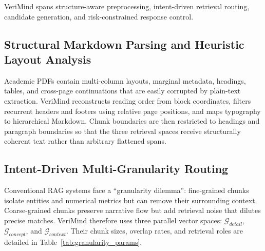 \documentclass[smallextended]{svjour3}
\begin{document}
VeriMind spans structure-aware preprocessing, intent-driven retrieval routing, candidate generation, and risk-constrained response control.

\subsection{Structural Markdown Parsing and Heuristic Layout Analysis}
\label{sec:structural_parsing}

Academic PDFs contain multi-column layouts, marginal metadata, headings, tables, and cross-page continuations that are easily corrupted by plain-text extraction. VeriMind reconstructs reading order from block coordinates, filters recurrent headers and footers using relative page positions, and maps typography to hierarchical Markdown. Chunk boundaries are then restricted to headings and paragraph boundaries so that the three retrieval spaces receive structurally coherent text rather than arbitrary flattened spans.

\subsection{Intent-Driven Multi-Granularity Routing}
\label{sec:routing}

Conventional RAG systems face a ``granularity dilemma'': fine-grained chunks isolate entities and numerical metrics but can remove their surrounding context. Coarse-grained chunks preserve narrative flow but add retrieval noise that dilutes precise matches. VeriMind therefore uses three parallel vector spaces: $\mathcal{G}_{detail}$, $\mathcal{G}_{concept}$, and $\mathcal{G}_{context}$. Their chunk sizes, overlap rates, and retrieval roles are detailed in Table~\ref{tab:granularity_params}.

\begin{table}[t]
\centering
\caption{Parameterization and Academic Rationale of the Index Spaces}
\label{tab:granularity_params}
\end{table}
\end{document}
